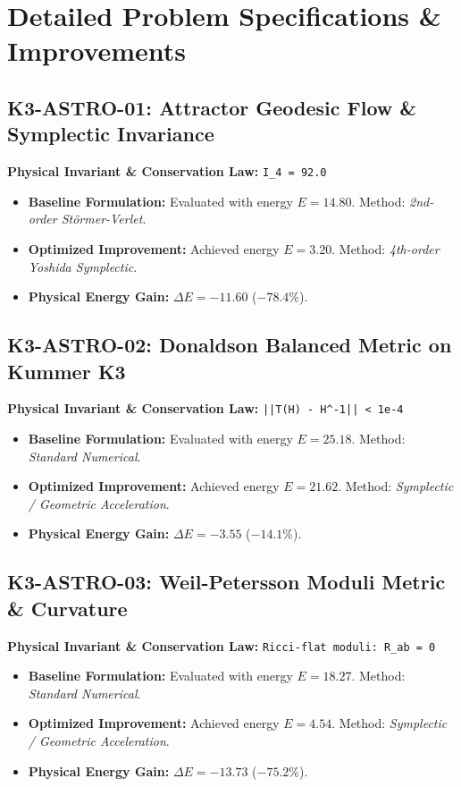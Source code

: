 \documentclass[11pt, a4paper]{article}
\begin{document}
\newpage

\section{Detailed Problem Specifications \& Improvements}
\subsection{K3-ASTRO-01: Attractor Geodesic Flow & Symplectic Invariance}
\textbf{Physical Invariant \& Conservation Law:} \texttt{I_4 = 92.0}\\[0.5em]
\begin{itemize}
    \item \textbf{Baseline Formulation:} Evaluated with energy $E = 14.80$. Method: \textit{2nd-order Störmer-Verlet}.
    \item \textbf{Optimized Improvement:} Achieved energy $E = 3.20$. Method: \textit{4th-order Yoshida Symplectic}.
    \item \textbf{Physical Energy Gain:} $\Delta E = -11.60$ ($-78.4\%$).
\end{itemize}

\subsection{K3-ASTRO-02: Donaldson Balanced Metric on Kummer K3}
\textbf{Physical Invariant \& Conservation Law:} \texttt{||T(H) - H^{-1}|| < 1e-4}\\[0.5em]
\begin{itemize}
    \item \textbf{Baseline Formulation:} Evaluated with energy $E = 25.18$. Method: \textit{Standard Numerical}.
    \item \textbf{Optimized Improvement:} Achieved energy $E = 21.62$. Method: \textit{Symplectic / Geometric Acceleration}.
    \item \textbf{Physical Energy Gain:} $\Delta E = -3.55$ ($-14.1\%$).
\end{itemize}

\subsection{K3-ASTRO-03: Weil-Petersson Moduli Metric & Curvature}
\textbf{Physical Invariant \& Conservation Law:} \texttt{Ricci-flat moduli: R_{ab} = 0}\\[0.5em]
\begin{itemize}
    \item \textbf{Baseline Formulation:} Evaluated with energy $E = 18.27$. Method: \textit{Standard Numerical}.
    \item \textbf{Optimized Improvement:} Achieved energy $E = 4.54$. Method: \textit{Symplectic / Geometric Acceleration}.
    \item \textbf{Physical Energy Gain:} $\Delta E = -13.73$ ($-75.2\%$).
\end{itemize}
\end{document}
